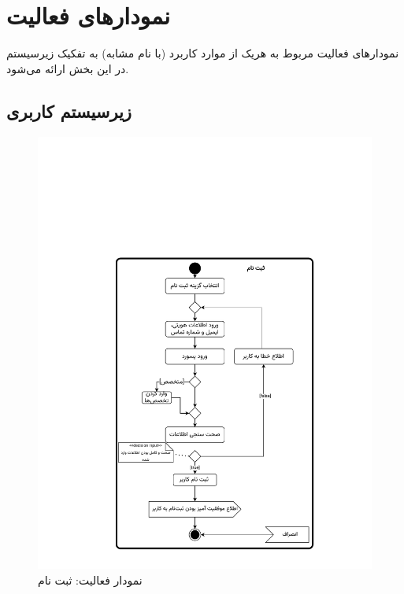 \chapter{نمودارهای فعالیت}

نمودارهای فعالیت مربوط به هریک از موارد کاربرد (با نام مشابه) به تفکیک زیرسیستم در این بخش ارائه می‌شود.
\newpage
\section{زیرسیستم کاربری}

\begin{figure}[ht!]
	\centering
	\includegraphics[scale=0.6, page=1]{figs/OOD-activity1-10.pdf}
	\caption{نمودار فعالیت: ثبت نام}
\end{figure}
\FloatBarrier
\newpage

